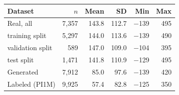 \begin{tabular}{@{}lrrrrr@{}}
\toprule
Dataset & $n$ & Mean & SD & Min & Max \\
\midrule
Real, all & 7,357 & 143.8 & 112.7 & \num{-139} & \num{495} \\
\quad training split & 5,297 & 144.0 & 113.6 & \num{-139} & \num{490} \\
\quad validation split & 589 & 147.0 & 109.0 & \num{-104} & \num{395} \\
\quad test split & 1,471 & 141.8 & 110.9 & \num{-129} & \num{495} \\
\addlinespace
Generated & 7,912 & 85.0 & 97.6 & \num{-139} & \num{420} \\
Labeled (PI1M) & 9,925 & 57.4 & 82.8 & \num{-125} & \num{350} \\
\bottomrule
\end{tabular}
